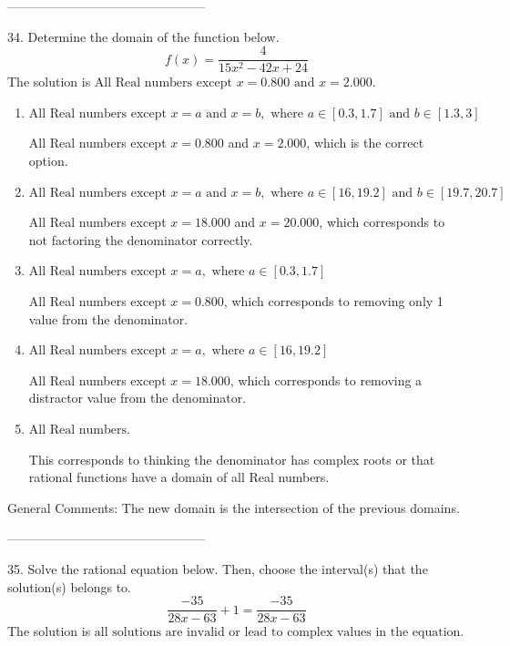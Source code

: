 \documentclass{extbook}[14pt]
\begin{document}
-----------------------------------------------

34. Determine the domain of the function below.
\[ f(x) = \frac{4}{15x^{2} -42 x + 24} \] 
The solution is $ \text{All Real numbers except } x = 0.800 \text{ and } x = 2.000. $ 

\begin{enumerate}[label=\Alph*.] 
\item $ \text{All Real numbers except } x = a \text{ and } x = b, \text{ where } a \in [0.3, 1.7] \text{ and } b \in [1.3, 3] $ 

 All Real numbers except $x = 0.800$ and $x = 2.000$, which is the correct option. 
\item $ \text{All Real numbers except } x = a \text{ and } x = b, \text{ where } a \in [16, 19.2] \text{ and } b \in [19.7, 20.7] $ 

 All Real numbers except $x = 18.000$ and $x = 20.000$, which corresponds to not factoring the denominator correctly. 
\item $ \text{All Real numbers except } x = a, \text{ where } a \in [0.3, 1.7] $ 

 All Real numbers except $x = 0.800$, which corresponds to removing only 1 value from the denominator. 
\item $ \text{All Real numbers except } x = a, \text{ where } a \in [16, 19.2] $ 

 All Real numbers except $x = 18.000$, which corresponds to removing a distractor value from the denominator. 
\item $ \text{All Real numbers.} $ 

 This corresponds to thinking the denominator has complex roots or that rational functions have a domain of all Real numbers. 
\end{enumerate} 
 
General Comments: The new domain is the intersection of the previous domains.

-----------------------------------------------

35. Solve the rational equation below. Then, choose the interval(s) that the solution(s) belongs to.
\[ \frac{-35}{28x -63} + 1 = \frac{-35}{28x -63} \] 
The solution is $ \text{all solutions are invalid or lead to complex values in the equation.} $ 
\end{document}
